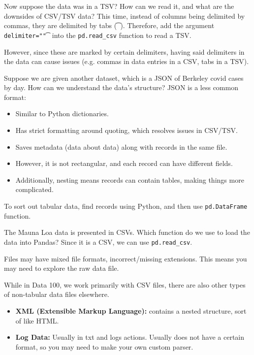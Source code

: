 \begin{example}{Now suppose the data was in a TSV? How can we read it, and what are the downsides of CSV/TSV data?
\tcbline 
This time, instead of columns being delimited by commas, they are delimited by tabs (\texttt{\t}). Therefore, add the argument \texttt{delimiter="\t"} into the \texttt{pd.read_csv} function to read a TSV.

However, since these are marked by certain delimiters, having said delimiters in the data can cause issues (e.g. commas in data entries in a CSV, tabs in a TSV).
}
\end{example}

\begin{example}[]{Suppose we are given another dataset, which is a JSON of Berkeley covid cases by day. How can we understand the data's structure?
\tcbline
JSON is a less common format:
\begin{itemize}
\item Similar to Python dictionaries.
\item Has strict formatting around quoting, which resolves issues in CSV/TSV.
\item Saves metadata (data about data) along with records in the same file.
\item However, it is not rectangular, and each record can have different fields. 
\item Additionally, nesting means records can contain tables, making things more complicated.
\end{itemize}
To sort out tabular data, find records using Python, and then use \texttt{pd.DataFrame} function.
}
\end{example}

\begin{example}{The Mauna Loa data is presented in CSVs. Which function do we use to load the data into Pandas?
\tcbline 
Since it is a CSV, we can use \texttt{pd.read_csv}.
}
\end{example}

\begin{notebox}[]
Files may have mixed file formats, incorrect/missing extensions. This means you may need to explore the raw data file.
\end{notebox}

While in Data 100, we work primarily with CSV files, there are also other types of non-tabular data files elsewhere.
\begin{itemize}
\item \textbf{XML (Extensible Markup Language):} contains a nested structure, sort of like HTML.
\item \textbf{Log Data:} Usually in txt and logs actions. Usually does not have a certain format, so you may need to make your own custom parser.
\end{itemize}


